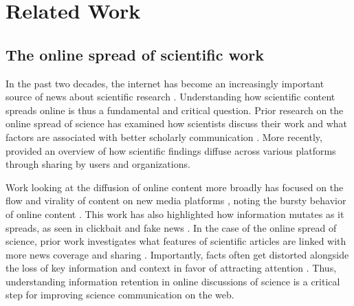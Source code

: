 \documentclass[letterpaper]{article} %
\begin{document}
\section{Related Work}
\subsection{The online spread of scientific work}
In the past two decades, the internet has become an increasingly important source of news about scientific research \citep{brossardNewMediaLandscapes2013,vaneperenHowScientistsUse2011,hargittaiHowYoungAdults2018,nationalscienceboardScienceTechnologyPublic2020}. %
Understanding how scientific content spreads online is thus a fundamental and critical question. Prior research on the online spread of science has examined how scientists discuss their work \cite{robinson-garciaUnbearableEmptinessTweeting2017,reinhardtHowPeopleAre2009} and what factors are associated with better scholarly communication \citep{milkmanScienceSharingSharing2014}. More recently, \citet{zakhlebinDiffusionScientificArticles2020} provided an overview of how scientific findings diffuse across various platforms through sharing by users and organizations.

Work looking at the diffusion of online content more broadly has focused on the flow and virality of content on new media platforms \cite{adarTrackingInformationEpidemics2005,adamicInformationEvolutionSocial2016,lakkarajuWhatNameUnderstanding2013,lermanInformationContagionEmpirical2010, romeroDifferencesMechanicsInformation2011,bakshyRoleSocialNetworks2012}, noting the bursty %
behavior of online content \citep{chengCanCascadesBe2014,chengCascadesRecur2016}. This work has also highlighted how information mutates as it spreads, as seen in clickbait and fake news \cite{chenMisleadingOnlineContent2015,vosoughiSpreadTrueFalse2018,lazerScienceFakeNews2018,guptaFakingSandyCharacterizing2013}.
In the case of the online spread of science, prior work investigates what features of scientific articles are linked with more news coverage and sharing \citep{milkmanScienceSharingSharing2014,maclaughlinPredictingNewsCoverage2018}. Importantly, facts often get distorted alongside the loss of key information and context in favor of attracting attention \citep[see for example][]{burnettHowMediaWarp2017}. Thus, understanding information retention in online discussions of science is a critical step for improving science communication on the web. 
\end{document}
